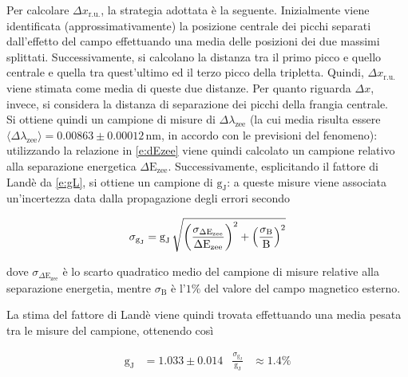 \documentclass[twocolumn,10pt]{asme2ej}
\begin{document}
Per calcolare $\Delta x_{\text{r.u.}}$, la strategia adottata è la seguente. Inizialmente viene identificata
(approssimativamente) la posizione centrale dei picchi separati dall'effetto del campo effettuando una media delle
posizioni dei due massimi splittati. Successivamente, si calcolano la distanza tra il primo picco e quello centrale e
quella tra quest'ultimo ed il terzo picco della tripletta. Quindi, $\Delta x_{\text{r.u.}}$ viene stimata come media di
queste due distanze. Per quanto riguarda $\Delta x$, invece, si considera la distanza di separazione dei picchi della
frangia centrale. \\
Si ottiene quindi un campione di misure di $\Delta\lambda_{\text{zee}}$ (la cui media risulta essere
$\langle\Delta\lambda_{\text{zee}}\rangle = 0.00863 \pm 0.00012 \,\si{\nano\metre}$, in accordo con le previsioni del
fenomeno): utilizzando la relazione in \autoref{e:dEzee} viene quindi calcolato un campione relativo alla separazione
energetica $\Delta \text{E}_{\text{zee}}$. Successivamente, esplicitando il fattore di Landè da \autoref{e:gL}, si
ottiene un campione di $\text{g}_{\text{J}}$: a queste misure viene associata un'incertezza data dalla propagazione
degli errori secondo

\vspace{-15pt}
\begin{equation}
    \sigma_{\text{g}_{\text{J}}} = \text{g}_{\text{J}} \, 
    \sqrt{ 
        \left(\frac{\sigma_{\Delta \text{E}_{\text{zee}}}}{\Delta \text{E}_{\text{zee}}}\right)^2 + 
        \left(\frac{\sigma_{\text{B}}}{\text{B}}\right)^2
        }
    \vspace{-5pt}
\end{equation}

\noindent dove $\sigma_{\Delta \text{E}_{\text{zee}}}$ è lo scarto quadratico medio del campione di misure relative alla
separazione energetia, mentre $\sigma_{\text{B}}$ è l'$1\%$ del valore del campo magnetico esterno. 

La stima del fattore di Landè viene quindi trovata effettuando una media pesata tra le misure del campione, ottenendo
così 

\vspace{-18pt}
\begin{align*}
    \text{g}_{\text{J}} &= 1.033 \pm 0.014 & \frac{\sigma_{\text{g}_{\text{J}}}}{\text{g}_{\text{J}}} &\approx 1.4\%
\end{align*}
\end{document}
